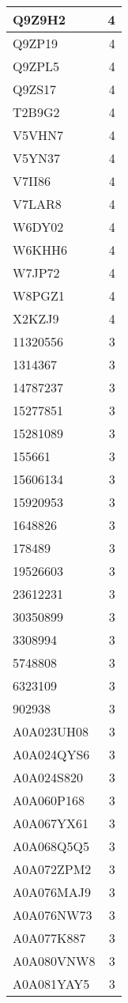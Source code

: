 \documentclass[
]{book}
\theoremstyle{definition}
\theoremstyle{definition}
\theoremstyle{definition}
\theoremstyle{definition}
\theoremstyle{remark}
\begin{document}
\begin{table}
\begin{tabular}{l|r}
\hline
Q9Z9H2 & 4\\
\hline
Q9ZP19 & 4\\
\hline
Q9ZPL5 & 4\\
\hline
Q9ZS17 & 4\\
\hline
T2B9G2 & 4\\
\hline
V5VHN7 & 4\\
\hline
V5YN37 & 4\\
\hline
V7II86 & 4\\
\hline
V7LAR8 & 4\\
\hline
W6DY02 & 4\\
\hline
W6KHH6 & 4\\
\hline
W7JP72 & 4\\
\hline
W8PGZ1 & 4\\
\hline
X2KZJ9 & 4\\
\hline
11320556 & 3\\
\hline
1314367 & 3\\
\hline
14787237 & 3\\
\hline
15277851 & 3\\
\hline
15281089 & 3\\
\hline
155661 & 3\\
\hline
15606134 & 3\\
\hline
15920953 & 3\\
\hline
1648826 & 3\\
\hline
178489 & 3\\
\hline
19526603 & 3\\
\hline
23612231 & 3\\
\hline
30350899 & 3\\
\hline
3308994 & 3\\
\hline
5748808 & 3\\
\hline
6323109 & 3\\
\hline
902938 & 3\\
\hline
A0A023UH08 & 3\\
\hline
A0A024QYS6 & 3\\
\hline
A0A024S820 & 3\\
\hline
A0A060P168 & 3\\
\hline
A0A067YX61 & 3\\
\hline
A0A068Q5Q5 & 3\\
\hline
A0A072ZPM2 & 3\\
\hline
A0A076MAJ9 & 3\\
\hline
A0A076NW73 & 3\\
\hline
A0A077K887 & 3\\
\hline
A0A080VNW8 & 3\\
\hline
A0A081YAY5 & 3\\

\end{tabular}
\end{table}
\end{document}
